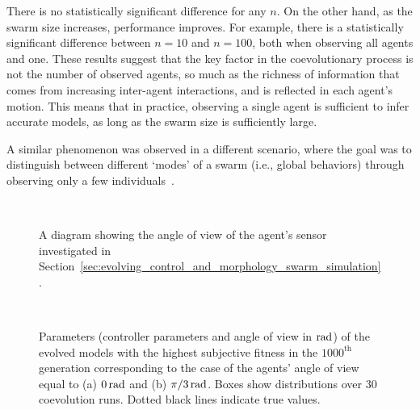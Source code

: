 There is no statistically significant difference for any $n$. On the other hand, as the swarm size increases, performance improves. For example, there is a statistically significant difference between $n=10$ and $n=100$, both when observing all agents and one. These results suggest that the key factor in the coevolutionary process is not the number of observed agents, so much as the richness of information that comes from increasing inter-agent interactions, and is reflected in each agent's motion. This means that in practice, observing a single agent is sufficient to infer accurate models, as long as the swarm size is sufficiently large.

A similar phenomenon was observed in a different scenario, where the goal was to distinguish between different `modes' of a swarm (i.e., global behaviors) through observing only a few individuals~\cite{Daniel2014}.

\begin{figure}[!t]%
	\centering
		\subfloat[(a) \label{fig:Angle_I=0}]{%
			\texttt{[image: Angle\_I=0.pdf]}
		}\\
		\subfloat[(b) \label{fig:Angle_I=1}]{%
			\texttt{[image: Angle\_I=1.pdf]}
		}
		\caption{A diagram showing the angle of view of the agent's sensor investigated in Section~\ref{sec:evolving_control_and_morphology_swarm_simulation}.}
		\label{fig:Angle_I}
\end{figure}

\begin{figure}[!t]%
	\centering
		\\
		\caption{Parameters (controller parameters and angle of view in $\unit[]{rad}$) of the evolved models with the highest subjective fitness in the $1000^\textrm{th}$ generation corresponding to the case of the agents' angle of view equal to (a) $\unit[0]{rad}$ and (b) $\unit[\pi/3]{rad}$. Boxes show distributions over $30$ coevolution runs. Dotted black lines indicate true values.}
		\label{fig:model_parameters_box_aggregation_angle}
\end{figure}

